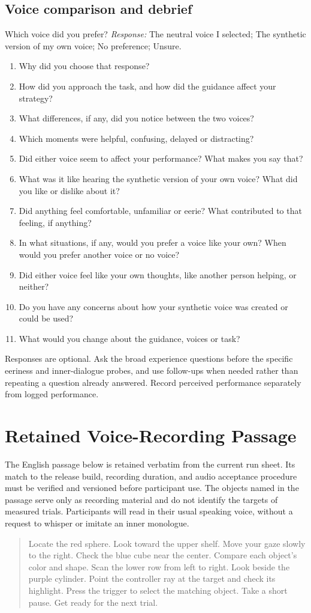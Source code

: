 \subsection{Voice comparison and debrief}
Which voice did you prefer?
\textit{Response:} The neutral voice I selected; The synthetic version of my own voice; No preference; Unsure.
\begin{enumerate}
\item Why did you choose that response?
\item How did you approach the task, and how did the guidance affect your strategy?
\item What differences, if any, did you notice between the two voices?
\item Which moments were helpful, confusing, delayed or distracting?
\item Did either voice seem to affect your performance? What makes you say that?
\item What was it like hearing the synthetic version of your own voice? What did you like or dislike about it?
\item Did anything feel comfortable, unfamiliar or eerie? What contributed to that feeling, if anything?
\item In what situations, if any, would you prefer a voice like your own? When would you prefer another voice or no voice?
\item Did either voice feel like your own thoughts, like another person helping, or neither?
\item Do you have any concerns about how your synthetic voice was created or could be used?
\item What would you change about the guidance, voices or task?
\end{enumerate}
Responses are optional. Ask the broad experience questions before the specific eeriness and inner-dialogue probes, and use follow-ups when needed rather than repeating a question already answered. Record perceived performance separately from logged performance.



\section{Retained Voice-Recording Passage}
The English passage below is retained verbatim from the current run sheet. Its match to the release build, recording duration, and audio acceptance procedure must be verified and versioned before participant use. The objects named in the passage serve only as recording material and do not identify the targets of measured trials. Participants will read in their usual speaking voice, without a request to whisper or imitate an inner monologue.

\begin{quote}
Locate the red sphere. Look toward the upper shelf. Move your gaze slowly to the right. Check the blue cube near the center. Compare each object's color and shape. Scan the lower row from left to right. Look beside the purple cylinder. Point the controller ray at the target and check its highlight. Press the trigger to select the matching object. Take a short pause. Get ready for the next trial.
\end{quote}
